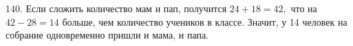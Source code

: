 140. Если сложить количество мам и пап, получится $24+18=42,$ что на $42-28=14$ больше, чем количество учеников в классе. Значит, у 14 человек на собрание одновременно пришли и мама, и папа.\\
